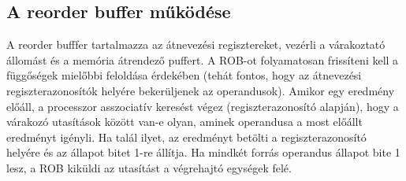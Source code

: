 \subsection{A reorder buffer működése}
A reorder bufffer tartalmazza az átnevezési regisztereket, vezérli a várakoztató állomást és a memória átrendező puffert.
A ROB-ot folyamatosan frissíteni kell a függőségek mielőbbi feloldása érdekében (tehát fontos, hogy az átnevezési regiszterazonosítók helyére bekerüljenek az operandusok).
Amikor egy eredmény előáll, a processzor asszociatív keresést végez (regiszterazonosító alapján), hogy a várakozó utasítások között van-e olyan, aminek operandusa a most előállt eredményt igényli.
Ha talál ilyet, az eredményt betölti a regiszterazonosító helyére és az állapot bitet 1-re állítja.
Ha mindkét forrás operandus állapot bite 1 lesz, a ROB kiküldi az utasítást a végrehajtó egységek felé.